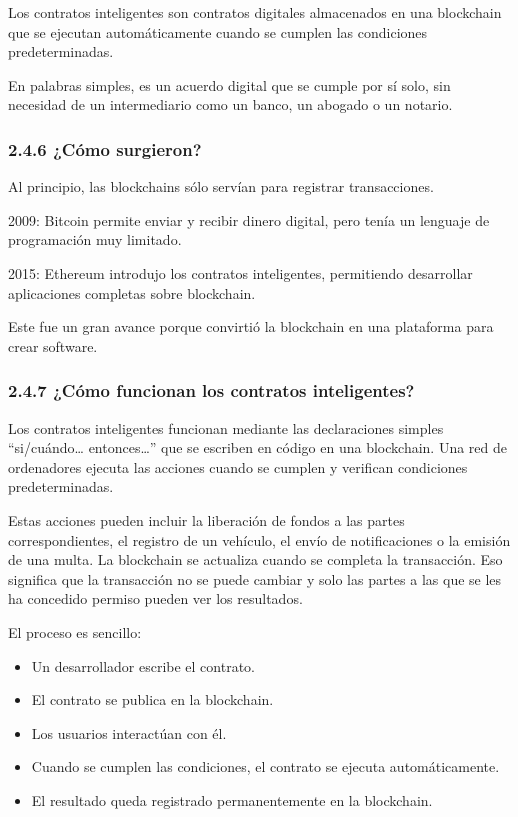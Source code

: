 \documentclass[12pt,a4paper]{article}
\begin{document}
Los contratos inteligentes son contratos digitales almacenados en una blockchain que se
ejecutan automáticamente cuando se cumplen las condiciones predeterminadas.

En palabras simples, es un acuerdo digital que se cumple por sí solo, sin necesidad de un
intermediario como un banco, un abogado o un notario.

\subsubsection*{2.4.6 ¿Cómo surgieron?}

Al principio, las blockchains sólo servían para registrar transacciones.

2009: Bitcoin permite enviar y recibir dinero digital, pero tenía un lenguaje de programación
muy limitado.

2015: Ethereum introdujo los contratos inteligentes, permitiendo desarrollar aplicaciones
completas sobre blockchain.

Este fue un gran avance porque convirtió la blockchain en una plataforma para crear
software.

\subsubsection*{2.4.7 ¿Cómo funcionan los contratos inteligentes?}

Los contratos inteligentes funcionan mediante las declaraciones simples ``si/cuándo\ldots{}
entonces\ldots{}'' que se escriben en código en una blockchain. Una red de ordenadores ejecuta
las acciones cuando se cumplen y verifican condiciones predeterminadas.

Estas acciones pueden incluir la liberación de fondos a las partes correspondientes, el
registro de un vehículo, el envío de notificaciones o la emisión de una multa. La blockchain
se actualiza cuando se completa la transacción. Eso significa que la transacción no se
puede cambiar y solo las partes a las que se les ha concedido permiso pueden ver los
resultados.

El proceso es sencillo:

\begin{itemize}
    \item Un desarrollador escribe el contrato.
    \item El contrato se publica en la blockchain.
    \item Los usuarios interactúan con él.
    \item Cuando se cumplen las condiciones, el contrato se ejecuta automáticamente.
    \item El resultado queda registrado permanentemente en la blockchain.
\end{itemize}
\end{document}
